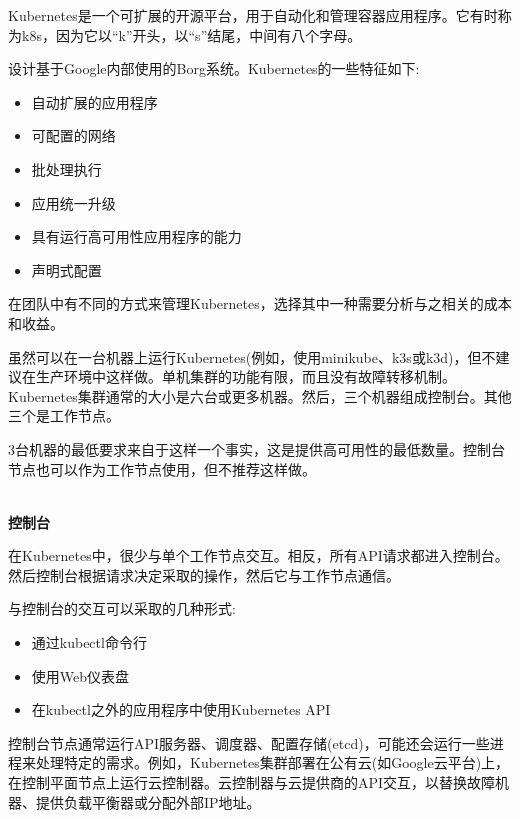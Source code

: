 
Kubernetes是一个可扩展的开源平台，用于自动化和管理容器应用程序。它有时称为k8s，因为它以“k”开头，以“s”结尾，中间有八个字母。

设计基于Google内部使用的Borg系统。Kubernetes的一些特征如下:

\begin{itemize}
\item 
自动扩展的应用程序

\item 
可配置的网络

\item 
批处理执行

\item 
应用统一升级

\item 
具有运行高可用性应用程序的能力

\item 
声明式配置
\end{itemize}

在团队中有不同的方式来管理Kubernetes，选择其中一种需要分析与之相关的成本和收益。


虽然可以在一台机器上运行Kubernetes(例如，使用minikube、k3s或k3d)，但不建议在生产环境中这样做。单机集群的功能有限，而且没有故障转移机制。Kubernetes集群通常的大小是六台或更多机器。然后，三个机器组成控制台。其他三个是工作节点。

3台机器的最低要求来自于这样一个事实，这是提供高可用性的最低数量。控制台节点也可以作为工作节点使用，但不推荐这样做。

\hspace*{\fill} \\ %
\noindent
\textbf{控制台}

在Kubernetes中，很少与单个工作节点交互。相反，所有API请求都进入控制台。然后控制台根据请求决定采取的操作，然后它与工作节点通信。

与控制台的交互可以采取的几种形式:

\begin{itemize}
\item 
通过kubectl命令行

\item 
使用Web仪表盘

\item 
在kubectl之外的应用程序中使用Kubernetes API
\end{itemize}

控制台节点通常运行API服务器、调度器、配置存储(etcd)，可能还会运行一些进程来处理特定的需求。例如，Kubernetes集群部署在公有云(如Google云平台)上，在控制平面节点上运行云控制器。云控制器与云提供商的API交互，以替换故障机器、提供负载平衡器或分配外部IP地址。

